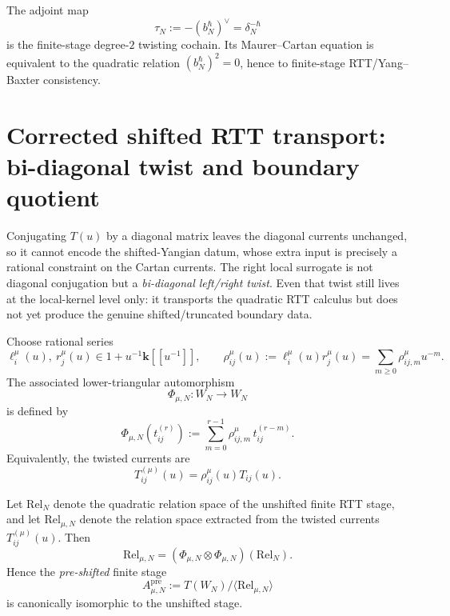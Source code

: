 \begin{corollary}
\label{cor:degree-two-twisting-cochain}
The adjoint map
\[
\tau_N:=-(b_N^\hbar)^\vee=\delta_N^{-\hbar}
\]
is the finite-stage degree-$2$ twisting cochain.  Its Maurer--Cartan equation is
equivalent to the quadratic relation $(b_N^\hbar)^2=0$, hence to finite-stage
RTT/Yang--Baxter consistency.
\end{corollary}

\section{Corrected shifted RTT transport: bi-diagonal twist and boundary quotient}
\label{sec:corrected-shifted-rtt-transport}

\begin{remark}
\label{rem:diagonal-conjugation-too-weak}
Conjugating $T(u)$ by a diagonal matrix leaves the diagonal currents unchanged,
so it cannot encode the shifted-Yangian datum, whose extra input is precisely a
rational constraint on the Cartan currents.  The right local surrogate is not
diagonal conjugation but a \emph{bi-diagonal left/right twist}.  Even that twist
still lives at the local-kernel level only: it transports the quadratic RTT
calculus but does not yet produce the genuine shifted/truncated boundary data.
\end{remark}

\begin{definition}
\label{def:bi-diagonal-twist}
Choose rational series
\[
\ell_i^\mu(u),\ r_j^\mu(u)\in 1+u^{-1}\mathbf{k}[[u^{-1}]],
\qquad
\rho_{ij}^\mu(u):=\ell_i^\mu(u)r_j^\mu(u)
=\sum_{m\ge 0}\rho_{ij,m}^\mu u^{-m}.
\]
The associated lower-triangular automorphism
\[
\Phi_{\mu,N}\colon W_N\to W_N
\]
is defined by
\[
\Phi_{\mu,N}(t_{ij}^{(r)})
:=
\sum_{m=0}^{r-1}\rho_{ij,m}^\mu\,t_{ij}^{(r-m)}.
\]
Equivalently, the twisted currents are
\[
T_{ij}^{(\mu)}(u)=\rho_{ij}^\mu(u)T_{ij}(u).
\]
\end{definition}

\begin{theorem}
\label{thm:transport-of-finite-rtt-relation-space}
Let $\mathrm{Rel}_N$ denote the quadratic relation space of the unshifted finite
RTT stage, and let $\mathrm{Rel}_{\mu,N}$ denote the relation space extracted
from the twisted currents $T_{ij}^{(\mu)}(u)$.  Then
\[
\mathrm{Rel}_{\mu,N}=(\Phi_{\mu,N}\otimes \Phi_{\mu,N})(\mathrm{Rel}_N).
\]
Hence the \emph{pre-shifted} finite stage
\[
A_{\mu,N}^{\mathrm{pre}}:=T(W_N)/\langle \mathrm{Rel}_{\mu,N}\rangle
\]
is canonically isomorphic to the unshifted stage.
\end{theorem}

